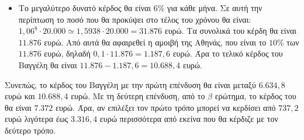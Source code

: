 \begin{alist}
\begin{itemize}
\item Το μεγαλύτερο δυνατό κέρδος θα είναι $6\%$ για κάθε μήνα. Σε αυτή την περίπτωση το
ποσό που θα προκύψει στο τέλος του χρόνου θα είναι:
$1,06^8 \cdot 20.000 \simeq 1,5938 \cdot 20.000 = 31.876$ ευρώ.
Τα συνολικά του κέρδη θα είναι $11.876$ ευρώ.
Από αυτά θα αφαιρεθεί η αμοιβή της Αθηνάς, που είναι το $10\%$ των $11.876$
ευρώ, δηλαδή $0,1 \cdot 11.876 = 1.187,6$ ευρώ. Άρα το τελικό κέρδος του Βαγγέλη θα
είναι $11.876 - 1.187,6 = 10.688,4$ ευρώ.
\end{itemize}
Συνεπώς, το κέρδος του Βαγγέλη με την πρώτη επένδυση θα είναι μεταξύ $6.634,8$ ευρώ και
$10.688,4$ ευρώ.
Με τη δεύτερη επένδυση, από το $\beta$ ερώτημα, το κέρδος του θα είναι $7.372$ ευρώ.
Άρα, αν επιλέξει τον πρώτο τρόπο μπορεί να κερδίσει από $737,2$ ευρώ λιγότερα έως
$3.316,4$ ευρώ περισσότερα από εκείνα που θα κέρδιζε με τον δεύτερο τρόπο.
\end{alist}

